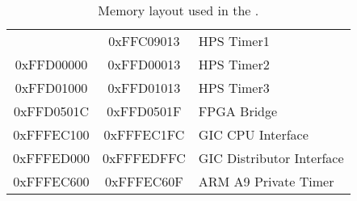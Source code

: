 \begin{table}[h]
\begin{center}
\begin{tabular}{c|c|l}
            & 0xFFC09013
            & HPS Timer1
        \\
            0xFFD00000
            & 0xFFD00013
            & HPS Timer2
        \\
            0xFFD01000
            & 0xFFD01013
            & HPS Timer3
        \\
            0xFFD0501C
            & 0xFFD0501F
            & FPGA Bridge
        \\
            0xFFFEC100
            & 0xFFFEC1FC
            & GIC CPU Interface
        \\
            0xFFFED000
            & 0xFFFEDFFC
            & GIC Distributor Interface
        \\
            0xFFFEC600
            & 0xFFFEC60F
            & ARM A9 Private Timer
        \\
    \end{tabular}
    \caption{Memory layout used in the \systemNameFull.}
    \label{tab:memorylayout}
    \end{center}
\end{table}




\clearpage












